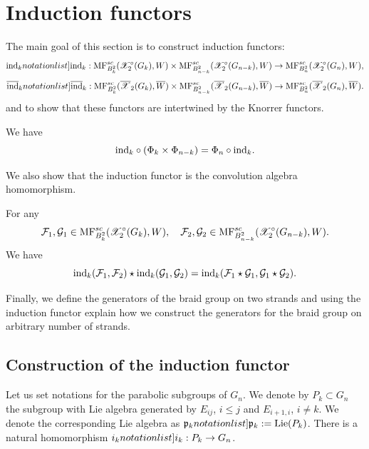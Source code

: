 


\def\frp{\mathfrak{p}}
\section{Induction functors}\label{sec: inc}

The main goal of this section is to construct induction functors:
$$ \SymbolPrint{\ind_k}: \MF_{B_k^2}(\calX_2^\circ(G_k),W)\times \MF_{B_{n-k}^2}(\calX^\circ_2(G_{n-k}),W)\to \MF_{B_n^2}(\calX_2^\circ(G_n),W),$$
$$ \SymbolPrint{\indb_k}: \MF_{B_k^2}(\calXr_2(G_k),\Wr)\times \MF_{B_{n-k}^2}(\calXr_2(G_{n-k}),\Wr)\to \MF_{B_n^2}(\calXr_2 (G_n),\Wr).$$
 and to show that these functors are intertwined by the Knorrer functors.
\begin{proposition}\label{prop: ind phi} We have
$$ \mathrm{ind}_k\circ (\Phi_k\times \Phi_{n-k} ) =\Phi_n\circ \mathrm{ind}_k.$$
\end{proposition}
We also show that the induction functor is the convolution algebra homomorphism.
\begin{proposition}\label{prop: ind homo} For any
  \[\mathcal{F}_1,\mathcal{G}_1\in \mathrm{MF}^{sc}_{B_k^2}(\mathscr{X}^\circ_2(G_k),W), \quad \mathcal{F}_2,\mathcal{G}_2\in \mathrm{MF}^{sc}_{B_{n-k}^2}(\mathscr{X}^\circ_2(G_{n-k}),W).\]
  We have
$$ \mathrm{ind}_k(\mathcal{F}_1,\mathcal{F}_2)\star\mathrm{ind}_{k}(\mathcal{G}_1,\mathcal{G}_2)=\mathrm{ind}_k(\mathcal{F}_1\star\mathcal{G}_1,\mathcal{G}_1\star\mathcal{G}_2).$$
\end{proposition}

Finally, we define the generators of the braid group on two strands and using the induction functor explain how we construct the generators for the braid group on
arbitrary number of strands.

\subsection{Construction of the induction functor}
Let us set notations for the parabolic subgroups of $G_n$. We denote by $P_k\subset G_n$  the subgroup with Lie algebra generated by
$E_{ij}$, $i\le j$ and $E_{i+1,i}$, $i\ne k$. We denote the corresponding Lie algebra as $\SymbolPrint{\frp_k}:=\Lie(P_k)$.
There is a natural homomorphism $\SymbolPrint{i_k}: P_k\to G_n$.




